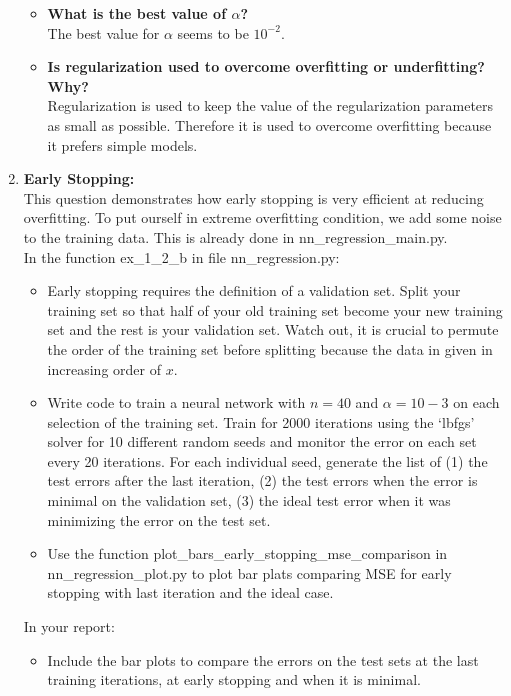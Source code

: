 \documentclass[a4paper]{article}
\begin{document}
\begin{enumerate}[label=(\alph*)]
\begin{itemize}
\item \textbf{What is the best value of $\alpha$?} \\
The best value for $\alpha$ seems to be $10^{-2}$. \\

\item \textbf{Is regularization used to overcome overfitting or underfitting? Why?} \\
Regularization is used to keep the value of the regularization parameters as small as possible. Therefore it is used to overcome overfitting because it prefers simple models.
\end{itemize}

\newpage

    \item \textbf{Early Stopping:}\\
    This question demonstrates how early stopping is very efficient at reducing overfitting. To put ourself in extreme overfitting condition, we add some noise to the training data. This is already done in nn\_regression\_main.py.\\
	In the function ex\_1\_2\_b in file nn\_regression.py:
    \begin{itemize}
        \item Early stopping requires the definition of a validation set. Split your training set so that half of your old training set become your new training set and the rest is your validation set. Watch out, it is crucial to permute the order of the training set before splitting because the data in given in increasing order of $x$.
        \item Write code to train a neural network with $n = 40$ and $\alpha = 10−3$ on each selection of the training set. Train for 2000 iterations using the ‘lbfgs’ solver for 10 different random seeds and monitor the error on each set every 20  iterations. For each individual seed, generate the list of (1) the test errors after the last iteration, (2) the test errors when the error is minimal on the validation set, (3) the ideal test error when it was minimizing the error on the test set.
        \item Use the function plot\_bars\_early\_stopping\_mse\_comparison in nn\_regression\_plot.py to plot bar plats comparing MSE for early stopping with last iteration and the ideal case.
    \end{itemize}
    In your report: 
    \begin{itemize}
        \item Include the bar plots to compare the errors on the test sets at the last training iterations, at early stopping and when it is minimal.

\end{itemize}
\end{enumerate}
\end{document}
